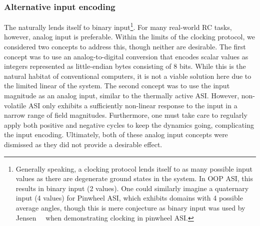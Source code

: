 \subsubsection{Alternative input encoding}\label{sec:3:clocking_input_encoding}
The  naturally lends itself to binary input\footnote{
	Generally speaking, a clocking protocol lends itself to as many possible input values as there are degenerate ground states in the system.
	In OOP ASI, this results in binary input (2 values).
	One could similarly imagine a quaternary input (4 values) for Pinwheel ASI, which exhibits  domains with 4 possible average  angles, though this is mere conjecture as binary input was used by Jensen~\etal~\cite{clocking-protocol} when demonstrating clocking in pinwheel ASI.
}.
For many real-world RC tasks, however, analog input is preferable.
Within the limits of the clocking protocol, we considered two concepts to address this, though neither are desirable.
The first concept was to use an analog-to-digital conversion that encodes scalar values as integers represented as little-endian bytes consisting of 8 bits.
While this is the natural habitat of conventional computers, it is not a viable solution here due to the limited linear  of the system.
The second concept was to use the input magnitude as an analog input, similar to the thermally active ASI.
However, non-volatile ASI only exhibits a sufficiently non-linear response to the input in a narrow range of field magnitudes.
Furthermore, one must take care to regularly apply both positive and negative cycles to keep the  dynamics going, complicating the input encoding.
Ultimately, both of these analog input concepts were dismissed as they did not provide a desirable effect.

